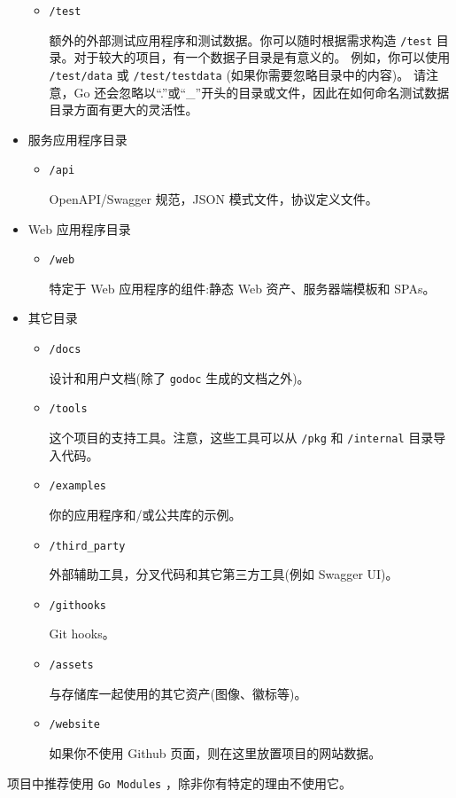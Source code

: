 \begin{itemize}[leftmargin=4em]
\begin{itemize}
  \item \texttt{/test}

    额外的外部测试应用程序和测试数据。你可以随时根据需求构造 \texttt{/test} 目录。对于较大的项目，有一个数据子目录是有意义的。
    例如，你可以使用 \texttt{/test/data} 或 \texttt{/test/testdata} (如果你需要忽略目录中的内容)。
    请注意，Go 还会忽略以“.”或“\_”开头的目录或文件，因此在如何命名测试数据目录方面有更大的灵活性。
  \end{itemize}
\item 服务应用程序目录

  \begin{itemize}
  \item \texttt{/api}

    OpenAPI/Swagger 规范，JSON 模式文件，协议定义文件。
  \end{itemize}
\item Web 应用程序目录

  \begin{itemize}
  \item \texttt{/web}

    特定于 Web 应用程序的组件:静态 Web 资产、服务器端模板和 SPAs。
  \end{itemize}
\item 其它目录

  \begin{itemize}
  \item \texttt{/docs}

    设计和用户文档(除了 \texttt{godoc} 生成的文档之外)。

  \item \texttt{/tools}

    这个项目的支持工具。注意，这些工具可以从 \texttt{/pkg} 和 \texttt{/internal} 目录导入代码。

  \item \texttt{/examples}

    你的应用程序和/或公共库的示例。

  \item \texttt{/third\_party}

    外部辅助工具，分叉代码和其它第三方工具(例如 Swagger UI)。

  \item \texttt{/githooks}

    Git hooks。

  \item \texttt{/assets}

    与存储库一起使用的其它资产(图像、徽标等)。

  \item \texttt{/website}

    如果你不使用 Github 页面，则在这里放置项目的网站数据。
  \end{itemize}
\end{itemize}

项目中推荐使用 \texttt{Go Modules} ，除非你有特定的理由不使用它。
